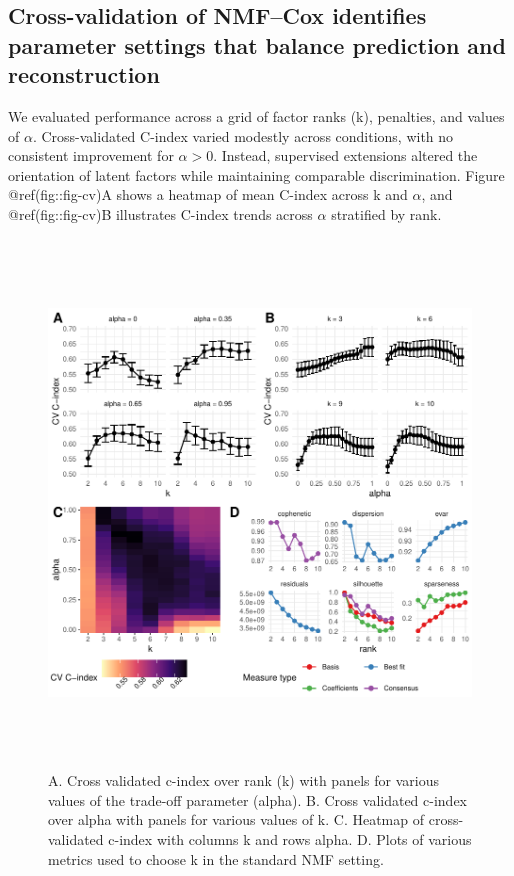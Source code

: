 \documentclass[9pt,twocolumn,twoside,]{pnas-new}
\begin{document}
\subsection{Cross-validation of NMF--Cox identifies parameter settings
that balance prediction and
reconstruction}\label{cross-validation-of-nmfcox-identifies-parameter-settings-that-balance-prediction-and-reconstruction}

We evaluated performance across a grid of factor ranks (k), penalties,
and values of \(\alpha\). Cross-validated C-index varied modestly across
conditions, with no consistent improvement for \(\alpha>0\). Instead,
supervised extensions altered the orientation of latent factors while
maintaining comparable discrimination. Figure @ref(fig::fig-cv)A shows a
heatmap of mean C-index across k and \(\alpha\), and @ref(fig::fig-cv)B
illustrates C-index trends across \(\alpha\) stratified by rank.

\begin{figure}[t]

{\centering \includegraphics[width=6in,height=5.5in]{paper_files/figure-latex/fig-cv-1} 

}

\caption{A. Cross validated c-index over rank (k) with panels for various values of the trade-off parameter (alpha). B. Cross validated c-index over alpha with panels for various values of k. C. Heatmap of cross-validated c-index with columns k and rows alpha. D. Plots of various metrics used to choose k in the standard NMF setting.}\label{fig:fig-cv}
\end{figure}
\end{document}
